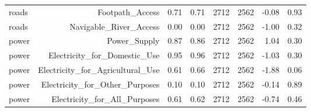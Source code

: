 \begin{table}[ht]
\begin{tabular}{lrrrrrrr}
  roads & Footpath_Access & 0.71 & 0.71 & 2712 & 2562 & -0.08 & 0.93 \\ 
  roads & Navigable_River_Access & 0.00 & 0.00 & 2712 & 2562 & -1.00 & 0.32 \\ 
  power & Power_Supply & 0.87 & 0.86 & 2712 & 2562 & 1.04 & 0.30 \\ 
  power & Electricity_for_Domestic_Use & 0.95 & 0.96 & 2712 & 2562 & -1.03 & 0.30 \\ 
  power & Electricity_for_Agricultural_Use & 0.61 & 0.66 & 2712 & 2562 & -1.88 & 0.06 \\ 
  power & Electricity_for_Other_Purposes & 0.10 & 0.10 & 2712 & 2562 & -0.14 & 0.89 \\ 
  power & Electricity_for_All_Purposes & 0.61 & 0.62 & 2712 & 2562 & -0.74 & 0.46 \\ 
   \hline
\end{tabular}
\end{table}
